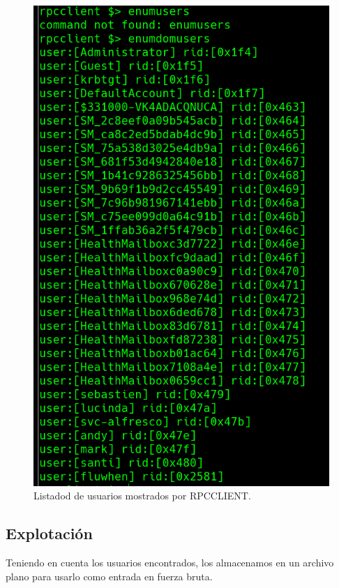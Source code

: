 \documentclass{article}
\begin{document}
\begin{figure}[H]
	\center
	\includegraphics[width=\textwidth/2]{images/forest/usuarios_rpc.png}
	\caption{Listadod de usuarios mostrados por RPCCLIENT.}
\end{figure}

\subsection{Explotación}

Teniendo en cuenta los usuarios encontrados, los almacenamos en un archivo plano para usarlo como entrada en fuerza bruta.
\end{document}
